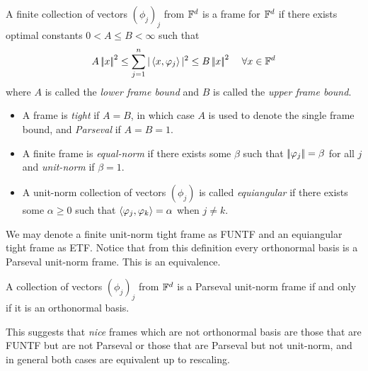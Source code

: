 \begin{Definition}
\label{def:frame}
    A finite collection of vectors $(\phi_j)_j$ from $\mathbb{F}^d$ is a frame for $\mathbb{F}^d$ if there exists optimal constants $0<A\leq B<\infty$ such that 
    \begin{equation}
        A\norm{x}^2\leq \sum_{j=1}^n|\ip{x,\phi_j}|^2\leq B\norm{x}^2\;\;\;\;\forall x\in \F^d
    \end{equation}
    where $A$ is called the \textit{lower frame bound} and $B$ is called the \textit{upper frame bound}. 
    \begin{itemize}
        \item A frame is \textit{tight} if $A=B$, in which case $A$ is used to denote the single frame bound, and \textit{Parseval} if $A=B=1$.
        \item A finite frame is \textit{equal-norm} if there exists some $\beta$ such that $\norm{\phi_j}=\beta$ for all $j$ and \textit{unit-norm} if $\beta=1$.
        \item A unit-norm collection of vectors $(\phi_j)$ is called \textit{equiangular} if there exists some $\alpha\geq 0$ such that $\left\langle \varphi_j,\varphi_k \right\rangle=\alpha$ when $j\neq k$.  
    \end{itemize} 
\end{Definition}
We may denote a finite unit-norm tight frame as FUNTF and an equiangular tight frame as ETF. Notice that from this definition every orthonormal basis is a Parseval unit-norm frame. This is an equivalence.
\begin{prop}
\label{prop:parc_iff_orthonoromalbasis}
    A collection of vectors $(\phi_j)_j$ from $\mathbb{F}^d$ is a Parseval unit-norm frame if and only if it is an orthonormal basis.
\end{prop}
\iftoggle{full}{
\begin{proof}
    First notice that any orthonormal basis satisfies Parseval's equality and therefore is a Parseval frame. An orthonormal basis also has unit-norm vectors. 
    
So now assume that $(\phi_j)_j$ is a unit-norm Parseval frame. This means for some fixed $k$ we have $1=\norm{\phi_k}=\sum_{j=1}^n|\ip{\phi_k,\phi_j}|^2=|\ip{\phi_k,\phi_k}|+\sum_{j\neq k}|\ip{\phi_k,\phi_j}|^2=1+\sum_{j\neq k}|\ip{\phi_k,\phi_j}|^2$
    Which means $\sum_{j\neq k}|\ip{\phi_k,\phi_j}|^2=0$ and because $|\ip{\phi_k,\phi_j}|^2\geq 0$ for all $j$, we know that $\ip{\phi_k,\phi_j}=0$ for all $j$ and all fixed $k$. Meaning $(\phi_j)_j$ is an orthonormal collection of vectors satisfying Parseval's equality and so is an orthonormal basis by Proposition \ref{prop:tfae_wparseval}.
\end{proof}
}{}
This suggests that \textit{nice} frames which are not orthonormal basis are those that are FUNTF but are not Parseval or those that are Parseval but not unit-norm, and in general both cases are equivalent up to rescaling.

